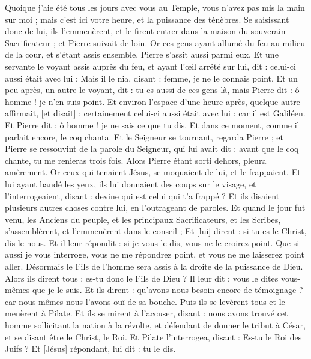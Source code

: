 \begin{multicols}{2}
Quoique j'aie été tous les jours avec vous au Temple, vous n'avez pas mis la main sur moi ; mais c'est ici votre heure, et la puissance des ténèbres.
Se saisissant donc de lui, ils l'emmenèrent, et le firent entrer dans la maison du souverain Sacrificateur ; et Pierre suivait de loin.
Or ces gens ayant allumé du feu au milieu de la cour, et s'étant assis ensemble, Pierre s'assit aussi parmi eux.
Et une servante le voyant assis auprès du feu, et ayant l'œil arrêté sur lui, dit : celui-ci aussi était avec lui ;
Mais il le nia, disant : femme, je ne le connais point.
Et un peu après, un autre le voyant, dit : tu es aussi de ces gens-là, mais Pierre dit : ô homme ! je n'en suis point.
Et environ l'espace d'une heure après, quelque autre affirmait, [et disait] : certainement celui-ci aussi était avec lui : car il est Galiléen.
Et Pierre dit : ô homme ! je ne sais ce que tu dis. Et dans ce moment, comme il parlait encore, le coq chanta.
Et le Seigneur se tournant, regarda Pierre ; et Pierre se ressouvint de la parole du Seigneur, qui lui avait dit : avant que le coq chante, tu me renieras trois fois.
Alors Pierre étant sorti dehors, pleura amèrement.
Or ceux qui tenaient Jésus, se moquaient de lui, et le frappaient.
Et lui ayant bandé les yeux, ils lui donnaient des coups sur le visage, et l'interrogeaient, disant : devine qui est celui qui t'a frappé ?
Et ils disaient plusieurs autres choses contre lui, en l'outrageant de paroles.
Et quand le jour fut venu, les Anciens du peuple, et les principaux Sacrificateurs, et les Scribes, s'assemblèrent, et l'emmenèrent dans le conseil ;
Et [lui] dirent : si tu es le Christ, dis-le-nous. Et il leur répondit : si je vous le dis, vous ne le croirez point.
Que si aussi je vous interroge, vous ne me répondrez point, et vous ne me laisserez point aller.
Désormais le Fils de l'homme sera assis à la droite de la puissance de Dieu.
Alors ils dirent tous : es-tu donc le Fils de Dieu ? Il leur dit : vous le dites vous-mêmes que je le suis.
Et ils dirent : qu'avons-nous besoin encore de témoignage ? car nous-mêmes nous l'avons ouï de sa bouche.
\VerseOne{}Puis ils se levèrent tous et le menèrent à Pilate.
Et ils se mirent à l'accuser, disant : nous avons trouvé cet homme sollicitant la nation à la révolte, et défendant de donner le tribut à César, et se disant être le Christ, le Roi.
Et Pilate l'interrogea, disant : Es-tu le Roi des Juifs ? Et [Jésus] répondant, lui dit : tu le dis.

\end{multicols}

